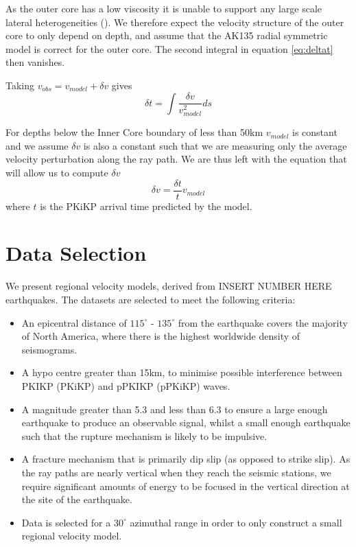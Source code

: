 \documentclass[11pt,a4paper]{article}
\begin{document}
As the outer core has a low viscosity it is unable to support any large scale lateral heterogeneities (\cite{Wijs1998}). We therefore expect the velocity structure of the outer core to only depend on depth, and assume that the AK135 radial symmetric model is correct for the outer core. The second integral in equation \eqref{eq:deltat} then vanishes.

Taking $v_{obs} = v_{model} + \delta v$ gives
\begin{equation}
	\delta t = \int \frac{\delta v}{v^{2}_{model}} ds
\end{equation}

For depths below the Inner Core boundary of less than 50km $v_{model}$ is constant and we assume $\delta v$ is also a constant such that we are measuring only the average velocity perturbation along the ray path. We are thus left with the equation that will allow us to compute $\delta v$
\begin{equation}
	\delta v = \frac{\delta t}{t} v_{model}
\end{equation}
where $t$ is the PKiKP arrival time predicted by the model.
\section{Data Selection}

We present regional velocity models, derived from INSERT NUMBER HERE earthquakes. The datasets are selected to meet the following criteria:

\begin{itemize}
	\item An epicentral distance of $115^{\circ}$ - $135^{\circ}$ from the earthquake covers the majority of North America, where there is the highest worldwide density of seismograms.
	\item A hypo centre greater than 15km, to minimise possible interference between PKIKP (PKiKP) and pPKIKP (pPKiKP) waves.
	\item A magnitude greater than 5.3 and less than 6.3 to ensure a large enough earthquake to produce an observable signal, whilst a small enough earthquake such that the rupture mechanism is likely to be impulsive.
	\item A fracture mechanism that is primarily dip slip (as opposed to strike slip). As the ray paths are nearly vertical when they reach the seismic stations, we require significant amounts of energy to be focused in the vertical direction at the site of the earthquake.
	\item Data is selected for a $30^{\circ}$ azimuthal range in order to only construct a small regional velocity model.
\end{itemize}
\end{document}
